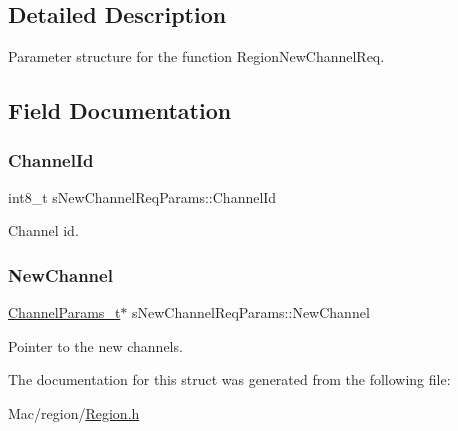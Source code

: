 \subsection{Detailed Description}
Parameter structure for the function Region\+New\+Channel\+Req. 

\subsection{Field Documentation}
\mbox{\label{structsNewChannelReqParams_a1bd8e73e08662496888e9102d81b5262}} 
\subsubsection{\texorpdfstring{Channel\+Id}{ChannelId}}
{\footnotesize\ttfamily int8\+\_\+t s\+New\+Channel\+Req\+Params\+::\+Channel\+Id}

Channel id. \mbox{\label{structsNewChannelReqParams_a62267cdad01a56a941b8a9a82be81708}} 
\subsubsection{\texorpdfstring{New\+Channel}{NewChannel}}
{\footnotesize\ttfamily \hyperlink{group__LORAMAC_ga1360ca6f82c6d125ea43a9dad9b56184}{Channel\+Params\+\_\+t}$\ast$ s\+New\+Channel\+Req\+Params\+::\+New\+Channel}

Pointer to the new channels. 

The documentation for this struct was generated from the following file\+:\begin{DoxyCompactItemize}
\item 
Mac/region/\hyperlink{Region_8h}{Region.\+h}\end{DoxyCompactItemize}
